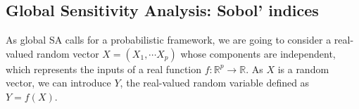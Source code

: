 \documentclass[../../Main_ManuscritThese.tex]{subfiles}
\begin{document}

\subsection{Global Sensitivity Analysis: Sobol' indices}
\label{sec:sobol-indices}
As global SA calls for a probabilistic framework, we are going to
consider a real-valued random vector $X=(X_1,\cdots X_p)$ whose
components are independent, which represents the inputs of a real
function $f: \mathbb{R}^p\rightarrow \mathbb{R}$. As $X$ is a random
vector, we can introduce $Y$, the real-valued random variable defined
as $Y=f(X)$.
\end{document}

